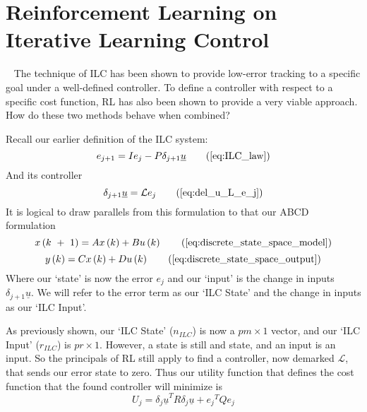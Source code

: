 \section{Reinforcement Learning on Iterative Learning Control}
~\label{sec:rl_on_ilc}
The technique of ILC has been shown to provide low-error tracking to a specific goal under a well-defined controller. To define a controller with respect to a specific cost function, RL has also been shown to provide a very viable approach. How do these two methods behave when combined?

Recall our earlier definition of the ILC system:
\begin{equation}
	e_{j+1}=Ie_j-P\delta_{j+1}\underline{u}
    \tag{\ref{eq:ILC_law}}
\end{equation}
And its controller
\begin{equation}
	\delta_{j+1}\underline{u}=\mathcal{L}e_j
    \tag{\ref{eq:del_u_L_e_j}}
\end{equation}
It is logical to draw parallels from this formulation to that our ABCD formulation
\begin{equation}
    x\left(k\ +\ 1\right)=Ax\left(k\right)+Bu\left(k\right)
    \tag{\ref{eq:discrete_state_space_model}}
\end{equation}
\begin{equation}
    y\left(k\right)=Cx\left(k\right)+Du\left(k\right)
    \tag{\ref{eq:discrete_state_space_output}}
\end{equation}
Where our `state' is now the error $e_j$ and our `input' is the change in inputs $\delta_{j+1}\underline{u}$. We will refer to the error term as our `ILC State' and the change in inputs as our `ILC Input'. 

As previously shown, our `ILC State' ($n_{ILC}$) is now a $pm \times1$ vector, and our `ILC Input' ($r_{ILC}$) is $pr \times1$. However, a state is still and state, and an input is an input. So the principals of RL still apply to find a controller, now demarked $\mathcal{L}$, that sends our error state to zero. Thus our utility function that defines the cost function that the found controller will minimize is
\begin{equation}
    U_j = {\delta_j \underline{u}}^T R {\delta_j \underline{u}} + {e_j}^T Q {e_j}
    \label{eq:ilc_utility}
\end{equation}

